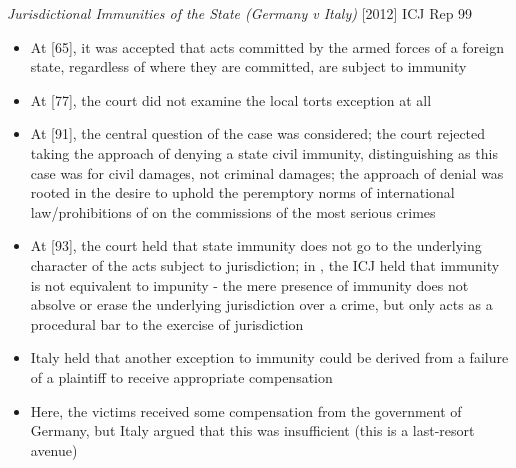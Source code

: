 \begin{casedetails}{\textit{Jurisdictional Immunities of the State (Germany v Italy)} [2012] ICJ Rep 99}
    \begin{itemize}
        \item At [65], it was accepted that acts committed by the armed forces of a foreign state, regardless of where they are committed, are subject to immunity
        \item At [77], the court did not examine the local torts exception at all
        \item At [91], the central question of the case was considered; the court rejected taking the approach of denying a state civil immunity, distinguishing  as this case was for civil damages, not criminal damages; the approach of denial was rooted in the desire to uphold the peremptory norms of international law/prohibitions of on the commissions of the most serious crimes
        \item At [93], the court held that state immunity does not go to the underlying character of the acts subject to jurisdiction; in , the ICJ held that immunity is not equivalent to impunity - the mere presence of immunity does not absolve or erase the underlying jurisdiction over a crime, but only acts as a procedural bar to the exercise of jurisdiction
        \item Italy held that another exception to immunity could be derived from a failure of a plaintiff to receive appropriate compensation
        \item Here, the victims received some compensation from the government of Germany, but Italy argued that this was insufficient (this is a last-resort avenue)
    \end{itemize}
\end{casedetails}

